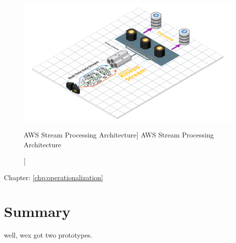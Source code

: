 \begin{figure}[ht]
    \includegraphics[width=\linewidth]{images/streaming/streamingaws.png}\centering
    \caption
    [AWS Stream Processing Architecture]
    {AWS Stream Processing Architecture}
    \label{fig:awsStreamingArchitecture}
\end{figure}

Chapter: \ref{chp:operationalization}




\section{Summary}

well, wex got two prototypes.